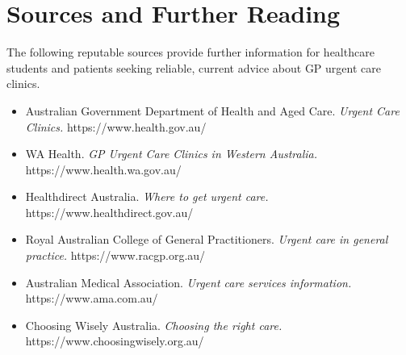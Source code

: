 \section*{Sources and Further Reading}
The following reputable sources provide further information for healthcare students and patients seeking reliable, current advice about GP urgent care clinics.

\begin{itemize}
    \item Australian Government Department of Health and Aged Care. \textit{Urgent Care Clinics.} https://www.health.gov.au/
    \item WA Health. \textit{GP Urgent Care Clinics in Western Australia.} https://www.health.wa.gov.au/
    \item Healthdirect Australia. \textit{Where to get urgent care.} https://www.healthdirect.gov.au/
    \item Royal Australian College of General Practitioners. \textit{Urgent care in general practice.} https://www.racgp.org.au/
    \item Australian Medical Association. \textit{Urgent care services information.} https://www.ama.com.au/
    \item Choosing Wisely Australia. \textit{Choosing the right care.} https://www.choosingwisely.org.au/
\end{itemize}
